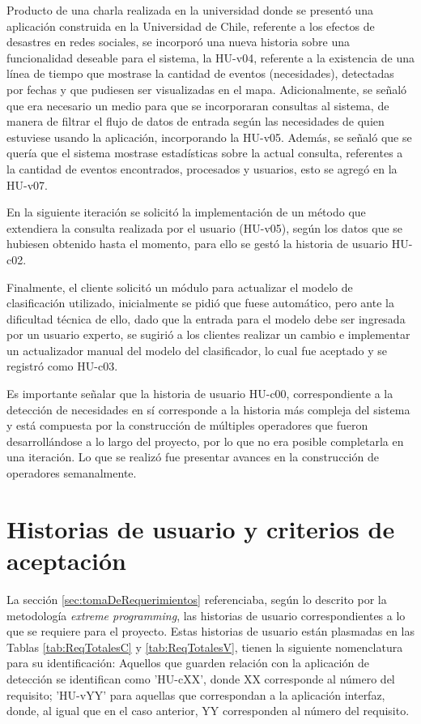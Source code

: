 Producto de una charla realizada en la universidad donde se presentó una aplicación construida en la Universidad de Chile, referente a los efectos de desastres en redes sociales, se incorporó una nueva historia sobre una funcionalidad deseable para el sistema, la HU-v04, referente a la existencia de una línea de tiempo que mostrase la cantidad de eventos (necesidades), detectadas por fechas y que pudiesen ser visualizadas en el mapa. Adicionalmente, se señaló que era necesario un medio para que se incorporaran consultas al sistema, de manera de filtrar el flujo de datos de entrada según las necesidades de quien estuviese usando la aplicación, incorporando la HU-v05. Además, se señaló que se quería que el sistema mostrase estadísticas sobre la actual consulta, referentes a la cantidad de eventos encontrados, procesados y usuarios, esto se agregó en la HU-v07.

En la siguiente iteración se solicitó la implementación de un método que extendiera la consulta realizada por el usuario (HU-v05), según los datos que se hubiesen obtenido hasta el momento, para ello se gestó la historia de usuario HU-c02.

Finalmente, el cliente solicitó un módulo para actualizar el modelo de clasificación utilizado, inicialmente se pidió que fuese automático, pero ante la dificultad técnica de ello, dado que la entrada para el modelo debe ser ingresada por un usuario experto, se sugirió a los clientes realizar un cambio e implementar un actualizador manual del modelo del clasificador, lo cual fue aceptado y se registró como HU-c03.

Es importante señalar que la historia de usuario HU-c00, correspondiente a la detección de necesidades en sí corresponde a la historia más compleja del sistema y está compuesta por la construcción de múltiples operadores que fueron desarrollándose a lo largo del proyecto, por lo que no era posible completarla en una iteración. Lo que se realizó fue presentar avances en la construcción de operadores semanalmente.

\section{Historias de usuario y criterios de aceptación}
\label{sec:historias}

La sección \ref{sec:tomaDeRequerimientos} referenciaba, según lo descrito por la metodología \textit{extreme programming}, las historias de usuario correspondientes a lo que se requiere para el proyecto. Estas historias de usuario están plasmadas en las Tablas \ref{tab:ReqTotalesC} y \ref{tab:ReqTotalesV}, tienen la siguiente nomenclatura para su identificación: Aquellos que guarden relación con la aplicación de detección se identifican como 'HU-cXX', donde XX corresponde al número del requisito; 'HU-vYY' para aquellas que correspondan a la aplicación interfaz, donde, al igual que en el caso anterior, YY corresponden al número del requisito.


